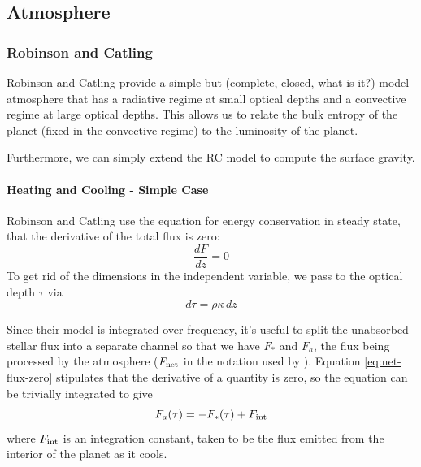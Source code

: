 \documentclass{emulateapj}
\begin{document}
\subsection{Atmosphere}

\subsubsection{Robinson and Catling}

Robinson and Catling provide a simple but (complete, closed, what is
it?) model atmosphere that has a radiative regime at small optical
depths and a convective regime at large optical depths.  This allows
us to relate the bulk entropy of the planet (fixed in the convective
regime) to the luminosity of the planet.  

Furthermore, we can simply extend the RC model to compute the surface
gravity.

\paragraph{Heating and Cooling - Simple Case}
Robinson and Catling use the equation for energy conservation in
steady state, that the derivative of the total flux is zero:
\begin{equation}
  \frac{dF}{dz} = 0
  \label{eq:net-flux-zero}
\end{equation}
To get rid of the dimensions in the independent variable, we pass to
the optical depth $\tau$ via
\begin{equation}
  d\tau = \rho \kappa \, dz
\end{equation}

Since their model is integrated over frequency, it's useful to split
the unabsorbed stellar flux into a separate channel so that we have
$F_*$ and $F_a$, the flux being processed by the atmosphere
($F_{\rm net}$ in the notation used by ).
Equation \ref{eq:net-flux-zero} stipulates that the derivative of a
quantity is zero, so the equation can be trivially integrated to give
\begin{equation}
  F_a(\tau) = -F_*(\tau) + F_{\rm int}
\end{equation}
where $F_{\rm int}$ is an integration constant, taken to be the flux
emitted from the interior of the planet as it cools.
\end{document}
